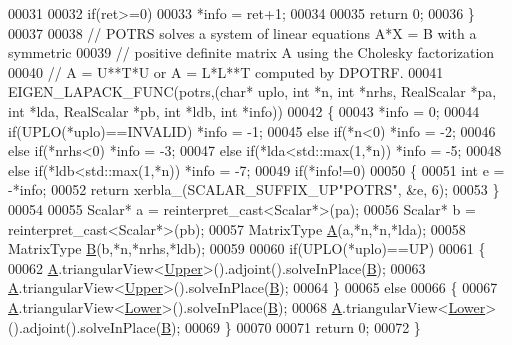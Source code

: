 \begin{DoxyCode}
00031 
00032   \textcolor{keywordflow}{if}(ret>=0)
00033     *info = ret+1;
00034   
00035   \textcolor{keywordflow}{return} 0;
00036 \}
00037 
00038 \textcolor{comment}{// POTRS solves a system of linear equations A*X = B with a symmetric}
00039 \textcolor{comment}{// positive definite matrix A using the Cholesky factorization}
00040 \textcolor{comment}{// A = U**T*U or A = L*L**T computed by DPOTRF.}
00041 EIGEN\_LAPACK\_FUNC(potrs,(\textcolor{keywordtype}{char}* uplo, \textcolor{keywordtype}{int} *n, \textcolor{keywordtype}{int} *nrhs, RealScalar *pa, \textcolor{keywordtype}{int} *lda, RealScalar *pb, \textcolor{keywordtype}{int} *ldb,
       \textcolor{keywordtype}{int} *info))
00042 \{
00043   *info = 0;
00044         \textcolor{keywordflow}{if}(UPLO(*uplo)==INVALID) *info = -1;
00045   \textcolor{keywordflow}{else}  \textcolor{keywordflow}{if}(*n<0)                 *info = -2;
00046   \textcolor{keywordflow}{else}  \textcolor{keywordflow}{if}(*nrhs<0)              *info = -3;
00047   \textcolor{keywordflow}{else}  \textcolor{keywordflow}{if}(*lda<std::max(1,*n))  *info = -5;
00048   \textcolor{keywordflow}{else}  \textcolor{keywordflow}{if}(*ldb<std::max(1,*n))  *info = -7;
00049   \textcolor{keywordflow}{if}(*info!=0)
00050   \{
00051     \textcolor{keywordtype}{int} e = -*info;
00052     \textcolor{keywordflow}{return} xerbla\_(SCALAR\_SUFFIX\_UP\textcolor{stringliteral}{"POTRS"}, &e, 6);
00053   \}
00054 
00055   Scalar* a = \textcolor{keyword}{reinterpret\_cast<}Scalar*\textcolor{keyword}{>}(pa);
00056   Scalar* b = \textcolor{keyword}{reinterpret\_cast<}Scalar*\textcolor{keyword}{>}(pb);
00057   MatrixType \hyperlink{group___core___module_class_eigen_1_1_matrix}{A}(a,*n,*n,*lda);
00058   MatrixType \hyperlink{group___core___module_class_eigen_1_1_matrix}{B}(b,*n,*nrhs,*ldb);
00059 
00060   \textcolor{keywordflow}{if}(UPLO(*uplo)==UP)
00061   \{
00062     \hyperlink{group___core___module_class_eigen_1_1_matrix}{A}.triangularView<\hyperlink{group__enums_gga39e3366ff5554d731e7dc8bb642f83cda6bcb58be3b8b8ec84859ce0c5ac0aaec}{Upper}>().adjoint().solveInPlace(\hyperlink{group___core___module_class_eigen_1_1_matrix}{B});
00063     \hyperlink{group___core___module_class_eigen_1_1_matrix}{A}.triangularView<\hyperlink{group__enums_gga39e3366ff5554d731e7dc8bb642f83cda6bcb58be3b8b8ec84859ce0c5ac0aaec}{Upper}>().solveInPlace(\hyperlink{group___core___module_class_eigen_1_1_matrix}{B});
00064   \}
00065   \textcolor{keywordflow}{else}
00066   \{
00067     \hyperlink{group___core___module_class_eigen_1_1_matrix}{A}.triangularView<\hyperlink{group__enums_gga39e3366ff5554d731e7dc8bb642f83cda891792b8ed394f7607ab16dd716f60e6}{Lower}>().solveInPlace(\hyperlink{group___core___module_class_eigen_1_1_matrix}{B});
00068     \hyperlink{group___core___module_class_eigen_1_1_matrix}{A}.triangularView<\hyperlink{group__enums_gga39e3366ff5554d731e7dc8bb642f83cda891792b8ed394f7607ab16dd716f60e6}{Lower}>().adjoint().solveInPlace(\hyperlink{group___core___module_class_eigen_1_1_matrix}{B});
00069   \}
00070 
00071   \textcolor{keywordflow}{return} 0;
00072 \}
\end{DoxyCode}
